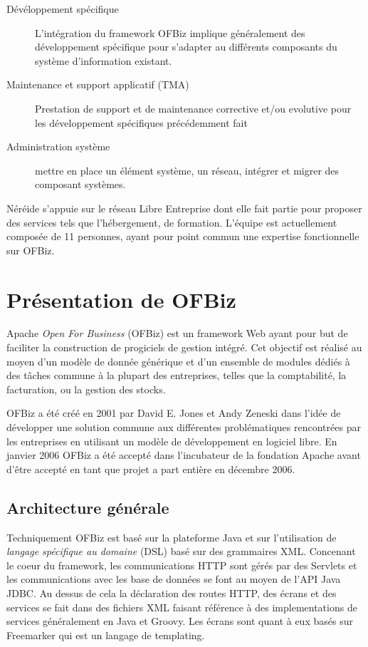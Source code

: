 \documentclass[a4paper, 11pt]{report}
\begin{document}
\begin{description}
\item[Dévéloppement spécifique] L'intégration du framework OFBiz
  implique généralement des développement spécifique pour s'adapter au
  différents composants du système d'information existant.
\item[Maintenance et support applicatif (TMA)] Prestation de support
  et de maintenance corrective et/ou evolutive pour les développement
  spécifiques précédemment fait
\item[Administration système] mettre en place un élément système, un
  réseau, intégrer et migrer des composant systèmes.
\end{description}

Néréide s'appuie sur le réseau Libre Entreprise dont elle fait partie
pour proposer des services tels que l'hébergement, de formation.
L'équipe est actuellement composée de 11 personnes, ayant pour point
commun une expertise fonctionnelle sur OFBiz.

\chapter{Présentation de OFBiz}

Apache \emph{Open For Business} (OFBiz) est un framework Web ayant
pour but de faciliter la construction de progiciels de gestion
intégré.  Cet objectif est réalisé au moyen d'un modèle de donnée
générique et d'un ensemble de modules dédiés à des tâches commune à la
plupart des entreprises, telles que la comptabilité, la facturation,
ou la gestion des stocks.

OFBiz a été créé en 2001 par David E. Jones et Andy Zeneski dans
l'idée de développer une solution commune aux différentes
problématiques rencontrées par les entreprises en utilisant un modèle
de développement en logiciel libre. En janvier 2006 OFBiz a été accepté
dans l'incubateur de la fondation Apache avant d'être accepté en tant
que projet a part entière en décembre 2006.

\section{Architecture générale}

Techniquement OFBiz est basé sur la plateforme Java et sur
l'utilisation de \emph{langage spécifique au domaine} (DSL) basé sur
des grammaires XML.  Concenant le coeur du framework, les
communications HTTP sont gérés par des Servlets \cite{chan2017servlet}
et les communications avec les base de données se font au moyen de
l'API Java JDBC.  Au dessus de cela la déclaration des routes HTTP,
des écrans et des services se fait dans des fichiers XML faisant
référence à des implementations de services généralement en Java et
Groovy.  Les écrans sont quant à eux basés sur Freemarker qui est un
langage de templating.
\end{document}
